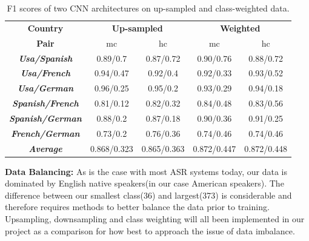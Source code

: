 \documentclass[11pt,a4paper,twoside]{article}
\begin{document}
\begin{table}[htbp]
\label{fig:compare_architectures}
\caption{F1 scores of two CNN architectures on up-sampled and class-weighted data.}
\begin{center}
\begin{tabular}{|c|c|c|c|c|}
\hline
\textbf{Country}&\multicolumn{2}{|c|}{\textbf{Up-sampled}}&\multicolumn{2}{|c|}{\textbf{Weighted}}\\
\cline{2-5}
\textbf{Pair} & mc & hc & mc & hc\\
\hline
\textbf{\textit{Usa/Spanish}} & 0.89/0.7 & 0.87/0.72 & 0.90/0.76 & 0.88/0.72
\\
\hline
\textbf{\textit{Usa/French}} & 0.94/0.47 & 0.92/0.4 & 0.92/0.33 & 0.93/0.52
\\
\hline
\textbf{\textit{Usa/German}} & 0.96/0.25 & 0.95/0.2 & 0.93/0.29 & 0.94/0.18
\\
\hline
\textbf{\textit{Spanish/French}} & 0.81/0.12 & 0.82/0.32 & 0.84/0.48 & 0.83/0.56
\\
\hline
\textbf{\textit{Spanish/German}} & 0.88/0.2 & 0.87/0.18 & 0.90/0.36 & 0.91/0.25
\\
\hline
\textbf{\textit{French/German}} & 0.73/0.2 & 0.76/0.36 & 0.74/0.46 & 0.74/0.46
\\
\hline
\textbf{\textit{Average}} & 0.868/0.323 & 0.865/0.363 & 0.872/0.447 & 0.872/0.448\\
\hline
\end{tabular}
\label{tab1}
\end{center}
\end{table}

\textbf{Data Balancing:} As is the case with most ASR systems today, our data is dominated by English native speakers(in our case American speakers). The difference between our smallest class(36) and largest(373) is considerable and therefore requires methods to better balance the data prior to training. Upsampling, downsampling and class weighting will all been implemented in our project as a comparison for how best to approach the issue of data imbalance.
\end{document}
